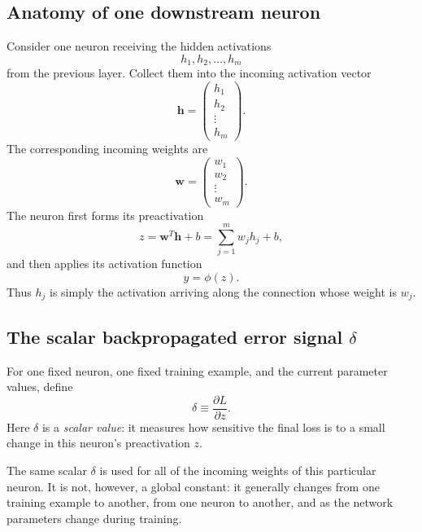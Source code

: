 \documentclass[11pt]{article}
\begin{document}
\subsection{Anatomy of one downstream neuron}

Consider one neuron receiving the hidden activations
\[
  h_1,h_2,\ldots,h_m
\]
from the previous layer.  Collect them into the incoming activation vector
\begin{equation}
  \mathbf h=
  \begin{pmatrix}
    h_1\\ h_2\\ \vdots\\ h_m
  \end{pmatrix}.
\end{equation}
The corresponding incoming weights are
\begin{equation}
  \mathbf w=
  \begin{pmatrix}
    w_1\\ w_2\\ \vdots\\ w_m
  \end{pmatrix}.
\end{equation}
The neuron first forms its preactivation
\begin{equation}
  z=\mathbf w^T\mathbf h+b
   =\sum_{j=1}^{m}w_j h_j+b,
  \label{eq:preactivation}
\end{equation}
and then applies its activation function
\begin{equation}
  y=\phi(z).
\end{equation}
Thus \(h_j\) is simply the activation arriving along the connection whose weight is \(w_j\).

\subsection{The scalar backpropagated error signal \texorpdfstring{\(\delta\)}{delta}}

For one fixed neuron, one fixed training example, and the current parameter values, define
\begin{equation}
  \boxed{\delta\equiv\frac{\partial L}{\partial z}.}
  \label{eq:delta}
\end{equation}
Here \(\delta\) is a \emph{scalar value}: it measures how sensitive the final loss is to a small change in this neuron's preactivation \(z\).

The same scalar \(\delta\) is used for all of the incoming weights of this particular neuron.  It is not, however, a global constant: it generally changes from one training example to another, from one neuron to another, and as the network parameters change during training.
\end{document}
